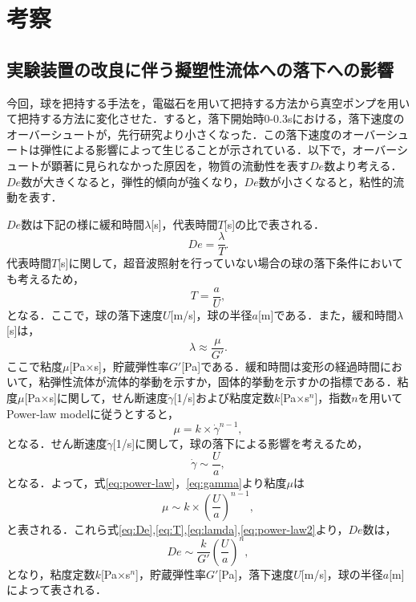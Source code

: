 \section{考察}

\subsection{実験装置の改良に伴う擬塑性流体への落下への影響}

今回，球を把持する手法を，電磁石を用いて把持する方法から真空ポンプを用いて把持する方法に変化させた．すると，落下開始時0-0.3sにおける，落下速度のオーバーシュートが，先行研究より小さくなった．この落下速度のオーバーシュートは弾性による影響によって生じることが示されている\cite{ref:12}．以下で，オーバーシュートが顕著に見られなかった原因を，物質の流動性を表す$De$数より考える．$De$数が大きくなると，弾性的傾向が強くなり，$De$数が小さくなると，粘性的流動を表す．

$De$数は下記の様に緩和時間$\lambda$[s]，代表時間$T$[s]の比で表される．
\begin{equation}
    De = \frac{\lambda}{T} .
    \label{eq:De}
\end{equation}
代表時間$T$[s]に関して，超音波照射を行っていない場合の球の落下条件においても考えるため，
\begin{equation}
    T = \frac{a}{U} ,
    \label{eq:T}
\end{equation}
となる．ここで，球の落下速度$U$[m/s]，球の半径$a$[m]である．また，緩和時間$\lambda$[s]は，
\begin{equation}
    \lambda \approx \frac{\mu}{G'} .
    \label{eq:lamda}
\end{equation}
ここで粘度$\mu$[Pa$\times$s]，貯蔵弾性率$G'$[Pa]である．緩和時間は変形の経過時間において，粘弾性流体が流体的挙動を示すか，固体的挙動を示すかの指標である\cite{ref:sakanishi}．粘度$\mu$[Pa$\times$s]に関して，せん断速度$\dot{\gamma}$[1/s]および粘度定数$k$[Pa$\times$s${}^n$]，指数$n$を用いてPower-law modelに従うとすると，
\begin{equation}
    \mu = k \times \dot{\gamma}^{n-1} ,
    \label{eq:power-law}
\end{equation}
となる．せん断速度$\dot{\gamma}$[1/s]に関して，球の落下による影響を考えるため，
\begin{equation}
    \dot{\gamma} \sim \frac{U}{a} ,
    \label{eq:gamma}
\end{equation}
となる．よって，式\ref{eq:power-law}，\ref{eq:gamma}より粘度$\mu$は
\begin{equation}
    \mu \sim k \times \left(\frac{U}{a}\right)^{n-1} ,
    \label{eq:power-law2}
\end{equation}
と表される．これら式\ref{eq:De},\ref{eq:T},\ref{eq:lamda},\ref{eq:power-law2}より，$De$数は，
\begin{equation}
    De \sim \frac{k}{G'} {\left(\frac{U}{a}\right)}^n ,
    \label{eq:De2}
\end{equation}
となり，粘度定数$k$[Pa$\times$s${}^n$]，貯蔵弾性率$G'$[Pa]，落下速度$U$[m/s]，球の半径$a$[m]によって表される．

